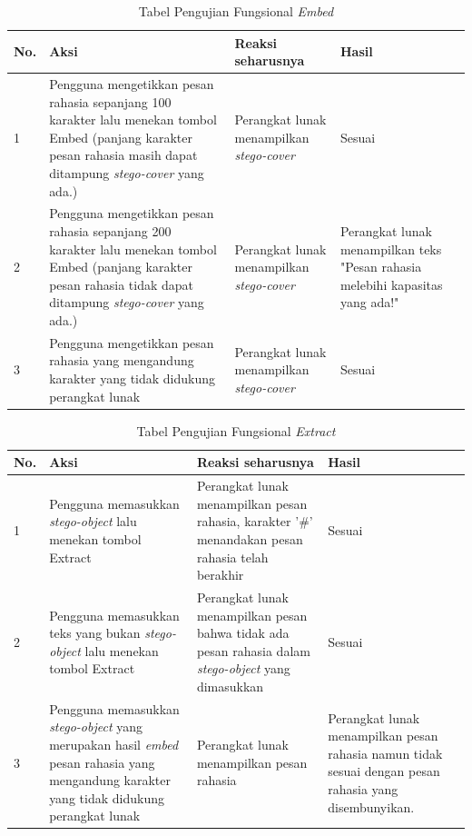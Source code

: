 \begin{table}[H]
\label{table-fungsional-embed}
\centering
\caption{Tabel Pengujian Fungsional \textit{Embed}}
\begin{tabular}{|p{0.3cm} | p{4.5cm} | p{7cm} | p{2.5cm} |}\hline
No. & Aksi & Reaksi seharusnya & Hasil\\
\hline
1 & Pengguna mengetikkan pesan rahasia sepanjang 100 karakter lalu menekan tombol Embed (panjang karakter pesan rahasia masih dapat ditampung \textit{stego-cover} yang ada.) & Perangkat lunak menampilkan \textit{stego-cover} & Sesuai\\
2 & Pengguna mengetikkan pesan rahasia sepanjang 200 karakter lalu menekan tombol Embed (panjang karakter pesan rahasia tidak dapat ditampung \textit{stego-cover} yang ada.) & Perangkat lunak menampilkan \textit{stego-cover} & Perangkat lunak menampilkan teks "Pesan rahasia melebihi kapasitas yang ada!"\\
3 & Pengguna mengetikkan pesan rahasia yang mengandung karakter yang tidak didukung perangkat lunak & Perangkat lunak menampilkan \textit{stego-cover} & Sesuai \\
\hline
\end{tabular}
\end{table}

\begin{table}[H]
\label{table-fungsional-extract}
\centering
\caption{Tabel Pengujian Fungsional \textit{Extract}}
\begin{tabular}{|p{0.3cm} | p{4.5cm} | p{7cm} | p{2.5cm} |}\hline
No. & Aksi & Reaksi seharusnya & Hasil\\
\hline
1 & Pengguna memasukkan \textit{stego-object} lalu menekan tombol Extract & Perangkat lunak menampilkan pesan rahasia, karakter '\#' menandakan pesan rahasia telah berakhir & Sesuai \\
2 & Pengguna memasukkan teks yang bukan \textit{stego-object} lalu menekan tombol Extract & Perangkat lunak menampilkan pesan bahwa tidak ada pesan rahasia dalam \textit{stego-object} yang dimasukkan & Sesuai \\
3 & Pengguna memasukkan \textit{stego-object} yang merupakan hasil \textit{embed} pesan rahasia yang mengandung karakter yang tidak didukung perangkat lunak & Perangkat lunak menampilkan pesan rahasia & Perangkat lunak menampilkan pesan rahasia namun tidak sesuai dengan pesan rahasia yang disembunyikan.\\
\hline
\end{tabular}
\end{table}

